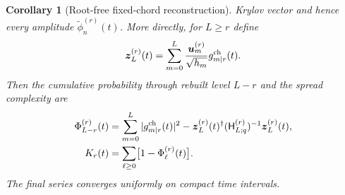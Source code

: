 \documentclass[a4paper,11pt]{article}
\newtheorem{corollary}[proposition]{Corollary}
\theoremstyle{definition}
\theoremstyle{remark}
\newcommand{\tphi}{\widetilde\phi}
\begin{document}
\begin{corollary}[Root-free fixed-chord reconstruction]
Krylov vector and hence every amplitude
$\tphi_n^{(r)}(t)$.  More directly, for $L\ge r$ define
\begin{equation}
   \boldsymbol z_L^{(r)}(t)=
   \sum_{m=0}^{L}
      \frac{\boldsymbol u_m^{(r)}}{\sqrt{h_m}}
      g_{m|r}^{\rm ch}(t).
\end{equation}
Then the cumulative probability through rebuilt level $L-r$ and the
spread complexity are
\begin{equation}
\begin{aligned}
   \Phi_{L-r}^{(r)}(t)
   &=\sum_{m=0}^{L}|g_{m|r}^{\rm ch}(t)|^2
     -\boldsymbol z_L^{(r)}(t)^\dagger
      (\mathsf H_{L;q}^{(r)})^{-1}\boldsymbol z_L^{(r)}(t),\\
   K_r(t)&=\sum_{\ell\ge0}\bigl[1-\Phi_\ell^{(r)}(t)\bigr].
   \label{eq:qhermite-cumulative-app}
\end{aligned}
\end{equation}
The final series converges uniformly on compact time intervals.
\end{corollary}
\end{document}
